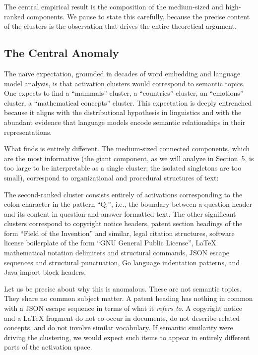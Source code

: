 \documentclass[12pt, a4paper]{article}
\theoremstyle{plain}
\theoremstyle{definition}
\theoremstyle{remark}
\begin{document}
The central empirical result is the composition of the medium-sized and
high-ranked components. We pause to state this carefully, because the precise
content of the clusters is the observation that drives the entire theoretical
argument.

\subsection{The Central Anomaly}

The na\"{i}ve expectation, grounded in decades of word embedding and language
model analysis, is that activation clusters would correspond to semantic topics.
One expects to find a ``mammals'' cluster, a ``countries'' cluster, an
``emotions'' cluster, a ``mathematical concepts'' cluster. This expectation is
deeply entrenched because it aligns with the distributional hypothesis in
linguistics \cite{rumelhart1986representations} and with the abundant evidence
that language models encode semantic relationships in their representations.

What \cite{liu2026normgeometry} finds is entirely different. The medium-sized
connected components, which are the most informative (the giant component, as
we will analyze in Section~5, is too large to be interpretable as a single
cluster; the isolated singletons are too small), correspond to organizational
and procedural structures of text:

The second-ranked cluster consists entirely of activations corresponding to
the colon character in the pattern ``Q:'', i.e., the boundary between a
question header and its content in question-and-answer formatted text. The
other significant clusters correspond to copyright notice headers, patent
section headings of the form ``Field of the Invention'' and similar, legal
citation structures, software license boilerplate of the form ``GNU General
Public License'', LaTeX mathematical notation delimiters and structural
commands, JSON escape sequences and structural punctuation, Go language
indentation patterns, and Java import block headers.

Let us be precise about why this is anomalous. These are not
semantic topics. They share no common subject matter. A patent heading has
nothing in common with a JSON escape sequence in terms of what it \emph{refers
to}. A copyright notice and a LaTeX fragment do not co-occur in documents, do
not describe related concepts, and do not involve similar vocabulary. If
semantic similarity were driving the clustering, we would expect such items to
appear in entirely different parts of the activation space.
\end{document}
